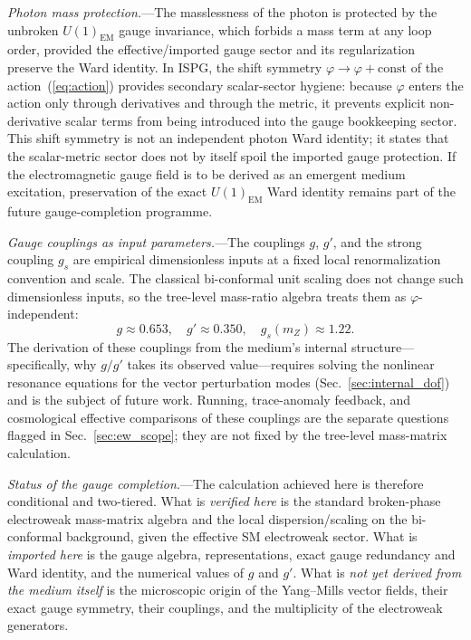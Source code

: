 \documentclass[aps,prd,onecolumn,superscriptaddress,nofootinbib,showpacs,12pt,notitlepage]{revtex4-2}
\begin{document}
\textit{Photon mass protection.}---The masslessness of the
photon is protected by the unbroken
$U(1)_{\mathrm{EM}}$ gauge invariance, which forbids a
mass term at any loop order, provided the effective/imported
gauge sector and its regularization preserve the Ward
identity.  In ISPG, the shift symmetry
$\varphi \to \varphi + \mathrm{const}$ of the
action~(\ref{eq:action}) provides secondary scalar-sector
hygiene:
because $\varphi$ enters the action only through
derivatives and through the metric, it prevents explicit
non-derivative scalar terms from being introduced into the
gauge bookkeeping sector.  This shift symmetry is not an
independent photon Ward identity; it states that the
scalar-metric sector does not by itself spoil the imported
gauge protection.  If the electromagnetic gauge field is to
be derived as an emergent medium excitation, preservation of
the exact $U(1)_{\mathrm{EM}}$ Ward identity remains part of
the future gauge-completion programme.

\textit{Gauge couplings as input parameters.}---The
couplings $g$, $g'$, and the strong coupling $g_s$ are
empirical dimensionless inputs at a fixed local
renormalization convention and scale.  The classical
bi-conformal unit scaling does not change such dimensionless
inputs, so the tree-level mass-ratio algebra treats them as
$\varphi$-independent:
\begin{equation}\label{eq:gauge_couplings}
  g \approx 0.653, \quad
  g' \approx 0.350, \quad
  g_s(m_Z) \approx 1.22.
\end{equation}
The derivation of these couplings from the medium's
internal structure---specifically, why $g/g'$ takes
its observed value---requires solving the nonlinear
resonance equations for the vector perturbation modes
(Sec.~\ref{sec:internal_dof}) and is the subject of
future work.  Running, trace-anomaly feedback, and
cosmological effective comparisons of these couplings are the
separate questions flagged in Sec.~\ref{sec:ew_scope}; they
are not fixed by the tree-level mass-matrix calculation.

\textit{Status of the gauge completion.}---The calculation
achieved here is therefore conditional and two-tiered.  What
is \emph{verified here} is the standard broken-phase
electroweak mass-matrix algebra and the local
dispersion/scaling on the bi-conformal background, given the
effective SM electroweak sector.  What is \emph{imported
here} is the gauge algebra, representations, exact gauge
redundancy and Ward identity, and the numerical values of
$g$ and $g'$.  What is \emph{not yet derived from the medium
itself} is the microscopic origin of the Yang--Mills vector
fields, their exact gauge symmetry, their couplings, and the
multiplicity of the electroweak generators.
\end{document}

